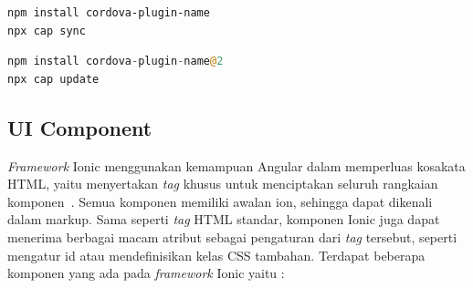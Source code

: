 \begin{lstlisting}[language=html, label={lst:installCordova}, caption=Kode untuk Memasang Cordova Plugins]
npm install cordova-plugin-name
npx cap sync
\end{lstlisting} 

\begin{lstlisting}[language=php, label={lst:updateCordova}, caption=Kode untuk Memperbarui Cordova Plugins]
npm install cordova-plugin-name@2
npx cap update
\end{lstlisting} 


\subsection{UI Component}
\label{subsec:uiComponent}
{\it Framework} Ionic menggunakan kemampuan Angular dalam memperluas kosakata HTML, yaitu menyertakan {\it tag} khusus untuk menciptakan seluruh rangkaian komponen~\cite{griffith:17:mobile}. Semua komponen memiliki awalan ion, sehingga dapat dikenali dalam markup. Sama seperti {\it tag} HTML standar, komponen Ionic juga dapat menerima berbagai macam atribut sebagai pengaturan dari {\it tag} tersebut, seperti mengatur id atau mendefinisikan kelas CSS tambahan. Terdapat beberapa komponen yang ada pada {\it framework} Ionic yaitu :
